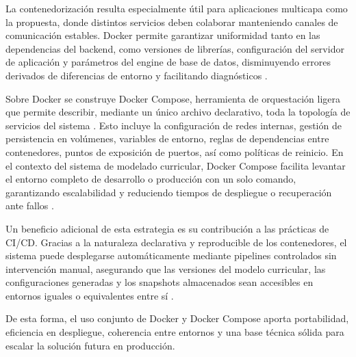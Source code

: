 {{        La contenedorización resulta especialmente útil para aplicaciones multicapa como 
        la propuesta, donde distintos servicios deben colaborar manteniendo canales de 
        comunicación estables. Docker permite garantizar uniformidad tanto en las 
        dependencias del backend, como versiones de librerías, configuración del servidor 
        de aplicación y parámetros del engine de base de datos, disminuyendo errores 
        derivados de diferencias de entorno y facilitando diagnósticos \citep{docker2024docs}.

        Sobre Docker se construye Docker Compose, herramienta de orquestación ligera que 
        permite describir, mediante un único archivo declarativo, toda la topología de 
        servicios del sistema \citep{docker2024docs}. Esto incluye la configuración de redes internas, gestión 
        de persistencia en volúmenes, variables de entorno, reglas de dependencias entre 
        contenedores, puntos de exposición de puertos, así como políticas de reinicio. 
        En el contexto del sistema de modelado curricular, Docker Compose facilita levantar 
        el entorno completo de desarrollo o producción con un solo comando, garantizando 
        escalabilidad y reduciendo tiempos de despliegue o recuperación ante fallos 
        \citep{boettiger2015introduction}.

        Un beneficio adicional de esta estrategia es su contribución a las prácticas de 
        \ac{CI/CD}. Gracias a la naturaleza 
        declarativa y reproducible de los contenedores, el sistema puede desplegarse 
        automáticamente mediante pipelines controlados sin intervención manual, asegurando 
        que las versiones del modelo curricular, las configuraciones generadas y los 
        snapshots almacenados sean accesibles en entornos iguales o equivalentes entre sí 
        \citep{docker2024docs}.

        De esta forma, el uso conjunto de Docker y Docker Compose aporta portabilidad,
        eficiencia en despliegue, coherencia entre entornos y una base técnica sólida para 
        escalar la solución futura en producción.
            
    }
    
    }
